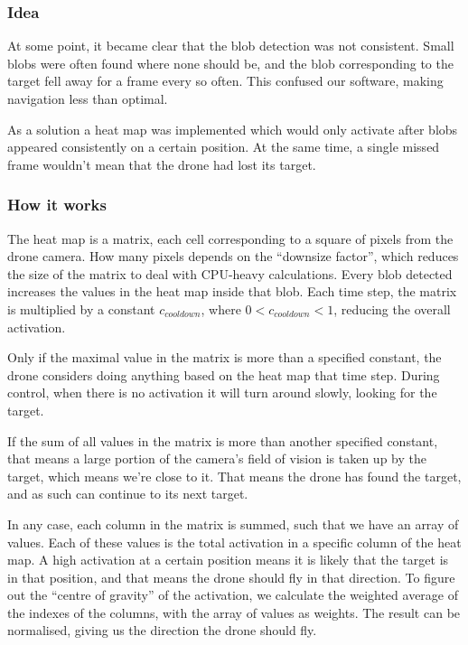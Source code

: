 \documentclass[a4paper,10pt]{article}
\begin{document}
\subsubsection{Idea}
At some point, it became clear that the blob detection was not consistent.
Small blobs were often found where none should be, and the blob corresponding
to the target fell away for a frame every so often. This confused our software,
making navigation less than optimal.

As a solution a heat map was implemented which
would only activate after blobs appeared consistently on a certain position.
At the same time, a single missed frame wouldn't mean that the drone had lost
its target.
\subsubsection{How it works}\label{subsec:howheatmapworks}
The heat map is a matrix, each cell corresponding to a square of
pixels from the drone camera. How many pixels depends on the ``downsize factor'',
which reduces the size of the matrix to deal with CPU-heavy calculations.
Every blob detected increases the
values in the heat map inside that blob. Each time step, the matrix is
multiplied by a constant $c_{{cooldown}}$, where
$0 < c_{{cooldown}} < 1$, reducing the overall
activation.

Only if the maximal value in the matrix is more than a specified constant,
the drone considers doing anything based on the heat map that time step.
During control, when there is no activation it will turn around slowly, looking for the target.

If the sum of all values in the matrix is more than another specified constant,
that means a large portion of the camera's field of vision is taken up
by the target, which means we're close to it. That means the drone has
found the target, and as such can continue to its next target.

In any case, each column in the matrix is summed, such that we have an
array of values. Each of these values is the total activation in a specific
column of the heat map. A high activation at a certain position means it is
likely that the target is in that position, and that means the drone should
fly in that direction. To figure out the ``centre of gravity'' of the
activation, we calculate the weighted average of the indexes of the columns,
with the array of values as weights. The result can be normalised, giving us
the direction the drone should fly.
\end{document}
